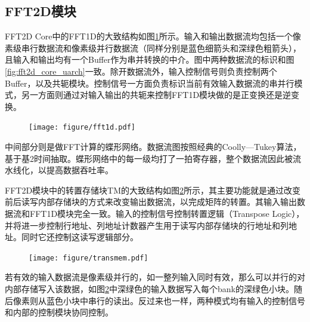\documentclass[master]{shtthesis}             %
\begin{document}
\subsection{FFT2D模块}
FFT2D Core中的FFT1D的大致结构如图\ref{fig:fft_arch}所示。输入和输出数据流均包括一个像素级串行数据流和像素级并行数据流（同样分别是蓝色细箭头和深绿色粗箭头），且输入和输出均有一个Buffer作为串并转换的中介。图中两种数据流的标识和图\ref{fig:fft2d_core_uarch}一致。除开数据流外，输入控制信号则负责控制两个Buffer，以及共轭模块。控制信号一方面负责标识当前有效输入数据流的串并行模式，另一方面则通过对输入输出的共轭来控制FFT1D模块做的是正变换还是逆变换。
\begin{figure}[!tb]
    \centering
    \texttt{[image: figure/fft1d.pdf]}
    \label{fig:fft_arch}
\end{figure}
中间部分则是做FFT计算的蝶形网络。数据流图按照经典的Coolly—Tukey算法，基于基2时间抽取。蝶形网络中的每一级均打了一拍寄存器，整个数据流因此被流水线化，以提高数据吞吐率。

FFT2D模块中的转置存储块TM的大致结构如图\ref{fig:transmem}所示，其主要功能就是通过改变前后读写内部存储块的方式来改变输出数据流，以完成矩阵的转置。其输入输出数据流和FFT1D模块完全一致。输入的控制信号控制转置逻辑（Transpose Logic），并将进一步控制行地址、列地址计数器产生用于读写内部存储块的行地址和列地址。同时它还控制这读写逻辑部分。
\begin{figure}[!tb]
  \centering
  \texttt{[image: figure/transmem.pdf]}
  \label{fig:transmem}
\end{figure}
若有效的输入数据流是像素级并行的，如一整列输入同时有效，那么可以并行的对内部存储写入该数据，如图\ref{fig:transmem}中深绿色的输入数据写入每个bank的深绿色小块。随后像素则从蓝色小块中串行的读出。反过来也一样，两种模式均有输入的控制信号和内部的控制模块协同控制。
\end{document}
